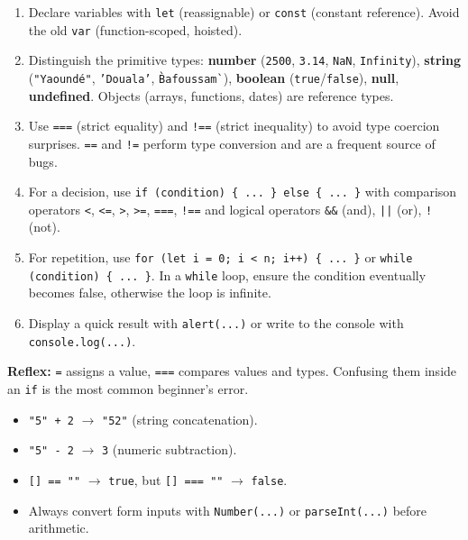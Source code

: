 \documentclass[11pt]{article}
\begin{document}
\begin{methode}
\begin{enumerate}
\item Declare variables with \texttt{let} (reassignable) or \texttt{const} (constant reference). Avoid the old \texttt{var} (function-scoped, hoisted).
\item Distinguish the primitive types: \textbf{number} (\texttt{2500}, \texttt{3.14}, \texttt{NaN}, \texttt{Infinity}), \textbf{string} (\texttt{"Yaoundé"}, \texttt{'Douala'}, \texttt{\`Bafoussam\`}), \textbf{boolean} (\texttt{true}/\texttt{false}), \textbf{null}, \textbf{undefined}. Objects (arrays, functions, dates) are reference types.
\item Use \texttt{===} (strict equality) and \texttt{!==} (strict inequality) to avoid type coercion surprises. \texttt{==} and \texttt{!=} perform type conversion and are a frequent source of bugs.
\item For a decision, use \texttt{if (condition) \{ ... \} else \{ ... \}} with comparison operators \texttt{<}, \texttt{<=}, \texttt{>}, \texttt{>=}, \texttt{===}, \texttt{!==} and logical operators \texttt{\&\&} (and), \texttt{||} (or), \texttt{!} (not).
\item For repetition, use \texttt{for (let i = 0; i < n; i++) \{ ... \}} or \texttt{while (condition) \{ ... \}}. In a \texttt{while} loop, ensure the condition eventually becomes false, otherwise the loop is infinite.
\item Display a quick result with \texttt{alert(...)} or write to the console with \texttt{console.log(...)}.
\end{enumerate}
\textbf{Reflex:} \texttt{=} assigns a value, \texttt{===} compares values and types. Confusing them inside an \texttt{if} is the most common beginner's error.
\end{methode}

\begin{attention}
\begin{itemize}
\item \texttt{"5" + 2} $\rightarrow$ \texttt{"52"} (string concatenation).
\item \texttt{"5" - 2} $\rightarrow$ \texttt{3} (numeric subtraction).
\item \texttt{[] == ""} $\rightarrow$ \texttt{true}, but \texttt{[] === ""} $\rightarrow$ \texttt{false}.
\item Always convert form inputs with \texttt{Number(...)} or \texttt{parseInt(...)} before arithmetic.
\end{itemize}
\end{attention}
\end{document}
